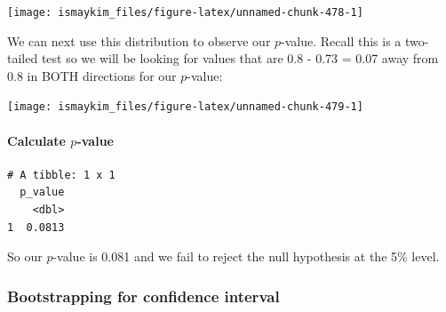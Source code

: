 \documentclass[12pt,]{krantz}
\makeatletter
\newenvironment{Shaded}{\begin{snugshade}}{\end{snugshade}}
\newcommand{\KeywordTok}[1]{\textcolor[rgb]{0.27,0.27,0.27}{\textbf{#1}}}
\newcommand{\DataTypeTok}[1]{\textcolor[rgb]{0.27,0.27,0.27}{#1}}
\newcommand{\StringTok}[1]{\textcolor[rgb]{0.5,0.5,0.5}{#1}}
\newcommand{\OperatorTok}[1]{\textcolor[rgb]{0.43,0.43,0.43}{\textbf{#1}}}
\newcommand{\NormalTok}[1]{#1}
\let\oldparagraph\paragraph
\renewcommand{\paragraph}[1]{\oldparagraph{#1}\mbox{}}
\newenvironment{kframe}{%
\medskip{}
\setlength{\fboxsep}{.8em}
 \def\at@end@of@kframe{}%
 \ifinner\ifhmode%
  \def\at@end@of@kframe{\end{minipage}}%
  \begin{minipage}{\columnwidth}%
 \fi\fi%
 \def\FrameCommand##1{\hskip\@totalleftmargin \hskip-\fboxsep
 \colorbox{shadecolor}{##1}\hskip-\fboxsep
     \hskip-\linewidth \hskip-\@totalleftmargin \hskip\columnwidth}%
 \MakeFramed {\advance\hsize-\width
   \@totalleftmargin\z@ \linewidth\hsize
   \@setminipage}}%
 {\par\unskip\endMakeFramed%
 \at@end@of@kframe}
\renewenvironment{Shaded}{\begin{kframe}}{\end{kframe}}
\theoremstyle{definition}
\theoremstyle{definition}
\theoremstyle{definition}
\theoremstyle{remark}
\makeatother
\begin{document}
\begin{center}\texttt{[image: ismaykim\_files/figure-latex/unnamed-chunk-478-1]} \end{center}

We can next use this distribution to observe our \(p\)-value. Recall
this is a two-tailed test so we will be looking for values that are 0.8
- 0.73 = 0.07 away from 0.8 in BOTH directions for our \(p\)-value:

\begin{Shaded}
\end{Shaded}

\begin{center}\texttt{[image: ismaykim\_files/figure-latex/unnamed-chunk-479-1]} \end{center}

\paragraph{\texorpdfstring{Calculate
\(p\)-value}{Calculate p-value}}\label{calculate-p-value-1}

\begin{Shaded}
\end{Shaded}

\begin{verbatim}
# A tibble: 1 x 1
  p_value
    <dbl>
1  0.0813
\end{verbatim}

So our \(p\)-value is 0.081 and we fail to reject the null hypothesis at
the 5\% level.

\subsubsection*{Bootstrapping for confidence
interval}\label{bootstrapping-for-confidence-interval-1}
\end{document}
